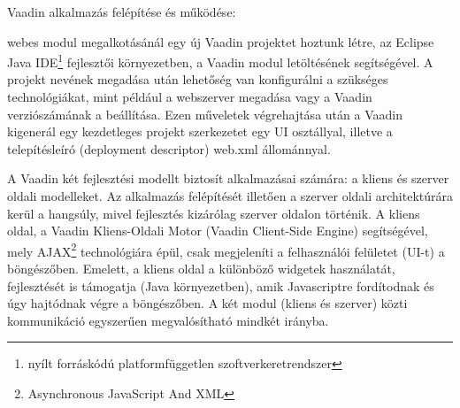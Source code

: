 \parEgy Vaadin alkalmazás felépítése és működése:

\parA webes modul megalkotásánál egy új Vaadin projektet hoztunk létre, az Eclipse Java IDE\footnote{ nyílt forráskódú platformfüggetlen szoftverkeretrendszer } fejlesztői környezetben, a Vaadin modul letöltésének segítségével. A projekt nevének megadása után lehetőség van konfigurálni a szükséges technológiákat, mint például a webszerver megadása vagy a Vaadin verziószámának a beállítása. Ezen műveletek végrehajtása után a Vaadin kigenerál egy kezdetleges projekt szerkezetet egy UI osztállyal, illetve a telepítésleíró (deployment descriptor) web.xml állománnyal. 

\par A Vaadin két fejlesztési modellt biztosít alkalmazásai számára: a kliens és szerver oldali modelleket. Az alkalmazás felépítését illetően a szerver oldali architektúrára kerül a hangsúly, mivel fejlesztés kizárólag szerver oldalon történik. A kliens oldal, a Vaadin Kliens-Oldali Motor (Vaadin Client-Side Engine) segítségével, mely AJAX\footnote{ Asynchronous JavaScript And XML } technológiára épül, csak megjeleníti a felhasználói felületet (UI-t) a böngészőben. Emelett, a kliens oldal a különböző widgetek használatát, fejlesztését is támogatja (Java környezetben), amik Javascriptre fordítodnak és úgy hajtódnak végre a böngészőben. A két modul (kliens és szerver) közti kommunikáció egyszerűen megvalósítható mindkét irányba.

